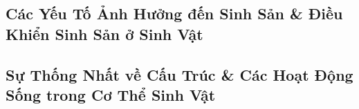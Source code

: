 \documentclass{article}
\numberwithin{equation}{section}
\begin{document}

\subsection{Các Yếu Tố Ảnh Hưởng đến Sinh Sản \& Điều Khiển Sinh Sản ở Sinh Vật}


\subsection{Sự Thống Nhất về Cấu Trúc \& Các Hoạt Động Sống trong Cơ Thể Sinh Vật}


\printbibliography[heading=bibintoc]
	
\end{document}
